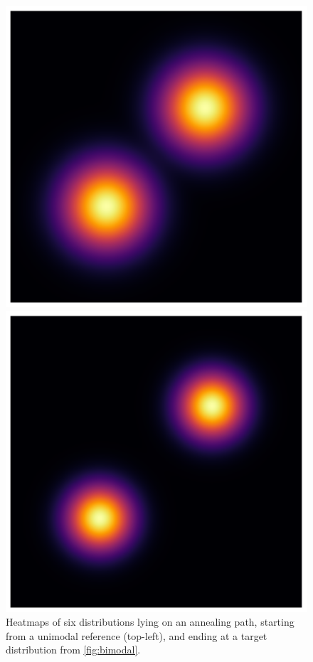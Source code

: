 \begin{figure}[t]
\begin{minipage}{0.333\linewidth}
    \end{minipage}%
    \begin{minipage}{0.333\linewidth}
      \centering
      \includegraphics[width=\linewidth]{../img/heatmap_path_5.pdf}
    \end{minipage}%
    \begin{minipage}{0.333\linewidth}
      \centering
      \includegraphics[width=\linewidth]{../img/heatmap_path_6.pdf}
    \end{minipage}
    \caption{Heatmaps of six distributions lying on an annealing path, 
    starting from a unimodal reference (top-left), and ending at a target
    distribution from \cref{fig:bimodal}.}
    \label{fig:path}
\end{figure}

